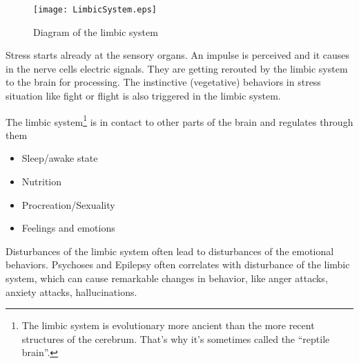 \documentclass[../main.tex]{subfiles}
\begin{document}

        \begin{figure}[htp]
        \centering
         \texttt{[image: LimbicSystem.eps]}
          \caption{Diagram of the limbic system~\cite{BlausenLimbic}}
        \end{figure}

        Stress starts already at the sensory organs. An impulse is perceived and it causes in the nerve cells electric signals. They are getting rerouted by the limbic system to the brain for processing.
        The instinctive (vegetative) behaviors in stress situation like fight or flight is also triggered in the limbic system.

        \newpage
        The limbic system\footnote{The limbic system is evolutionary more ancient than the more recent structures of the cerebrum. That's why it's sometimes called the ``reptile brain''.} is in contact to other parts of the brain and regulates through them
        \begin{itemize}
        \item Sleep/awake state
        \item Nutrition
        \item Procreation/Sexuality
          \item Feelings and emotions          
        \end{itemize}

        Disturbances of the limbic system often lead to disturbances of the emotional behaviors. Psychoses and Epilepsy often correlates with disturbance of the limbic system, which can cause  remarkable changes in behavior, like anger attacks, anxiety attacks, hallucinations.

        \newpage
\end{document}
